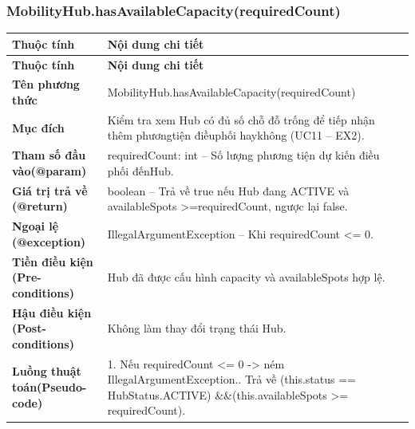\subsubsection{MobilityHub.hasAvailableCapacity(requiredCount)}
\begin{longtable}{|L{0.24\textwidth}|L{0.70\textwidth}|}
\hline
\textbf{Thuộc tính} & \textbf{Nội dung chi tiết} \\
\hline
\endfirsthead
\hline
\textbf{Thuộc tính} & \textbf{Nội dung chi tiết} \\
\hline
\endhead
\textbf{Tên phương thức} & MobilityHub.hasAvailableCapacity(requiredCount) \\
\hline
\textbf{Mục đích} & Kiểm tra xem Hub có đủ số chỗ đỗ trống để tiếp nhận thêm phương\newline tiện điềuphối haykhông (UC11 – EX2). \\
\hline
\textbf{Tham số đầu vào}\newline \textbf{(@param)} & requiredCount: int – Số lượng phương tiện dự kiến điều phối đến\newline Hub. \\
\hline
\textbf{Giá trị trả về (@return)} & boolean – Trả về true nếu Hub đang ACTIVE và availableSpots >=\newline requiredCount, ngược lại false. \\
\hline
\textbf{Ngoại lệ (@exception)} & IllegalArgumentException – Khi requiredCount <= 0. \\
\hline
\textbf{Tiền điều kiện (Pre-}\newline \textbf{conditions)} & Hub đã được cấu hình capacity và availableSpots hợp lệ. \\
\hline
\textbf{Hậu điều kiện (Post-}\newline \textbf{conditions)} & Không làm thay đổi trạng thái Hub. \\
\hline
\textbf{Luồng thuật toán}\newline \textbf{(Pseudo-code)} & 1. Nếu requiredCount <= 0 -> ném IllegalArgumentException.. Trả về (this.status == HubStatus.ACTIVE) \&\&\newline (this.availableSpots >= requiredCount). \\
\hline
\end{longtable}
\vspace{-0.5\baselineskip}
